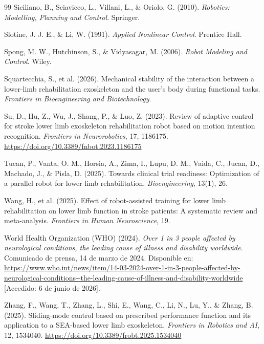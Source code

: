 \documentclass[a4paper,12pt]{article}
\begin{document}
\begin{thebibliography}{99}
    Siciliano, B., Sciavicco, L., Villani, L., \& Oriolo, G. (2010).
    \newblock \emph{Robotics: Modelling, Planning and Control}.
    \newblock Springer.

    Slotine, J. J. E., \& Li, W. (1991).
    \newblock \emph{Applied Nonlinear Control}.
    \newblock Prentice Hall.

    Spong, M. W., Hutchinson, S., \& Vidyasagar, M. (2006).
    \newblock \emph{Robot Modeling and Control}.
    \newblock Wiley.

    Squartecchia, S., et al. (2026).
    \newblock Mechanical stability of the interaction between a lower-limb rehabilitation exoskeleton and the user's body during functional tasks.
    \newblock \emph{Frontiers in Bioengineering and Biotechnology}.

    Su, D., Hu, Z., Wu, J., Shang, P., \& Luo, Z. (2023).
    \newblock Review of adaptive control for stroke lower limb exoskeleton rehabilitation robot based on motion intention recognition.
    \newblock \emph{Frontiers in Neurorobotics}, 17, 1186175.
    \newblock \url{https://doi.org/10.3389/fnbot.2023.1186175}

    Tucan, P., Vanta, O. M., Horsia, A., Zima, I., Lupu, D. M., Vaida, C., Jucan, D., Machado, J., \& Pisla, D. (2025).
    \newblock Towards clinical trial readiness: Optimization of a parallel robot for lower limb rehabilitation.
    \newblock \emph{Bioengineering}, 13(1), 26.

    Wang, H., et al. (2025).
    \newblock Effect of robot-assisted training for lower limb rehabilitation on lower limb function in stroke patients: A systematic review and meta-analysis.
    \newblock \emph{Frontiers in Human Neuroscience}, 19.

    World Health Organization (WHO) (2024).
    \newblock \emph{Over 1 in 3 people affected by neurological conditions, the leading cause of illness and disability worldwide}.
    \newblock Comunicado de prensa, 14 de marzo de 2024.
    \newblock Disponible en: \url{https://www.who.int/news/item/14-03-2024-over-1-in-3-people-affected-by-neurological-conditions--the-leading-cause-of-illness-and-disability-worldwide} [Accedido: 6 de junio de 2026].

    Zhang, F., Wang, T., Zhang, L., Shi, E., Wang, C., Li, N., Lu, Y., \& Zhang, B. (2025).
    \newblock Sliding-mode control based on prescribed performance function and its application to a SEA-based lower limb exoskeleton.
    \newblock \emph{Frontiers in Robotics and AI}, 12, 1534040.
    \newblock \url{https://doi.org/10.3389/frobt.2025.1534040}

\end{thebibliography}
\end{document}
